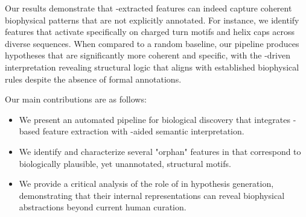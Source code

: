 Our results demonstrate that \sae-extracted features can indeed capture coherent biophysical patterns that are not explicitly annotated. For instance, we identify features that activate specifically on charged turn motifs and helix caps across diverse sequences. When compared to a random baseline, our pipeline produces hypotheses that are significantly more coherent and specific, with the \gpt-driven interpretation revealing structural logic that aligns with established biophysical rules despite the absence of formal annotations.

Our main contributions are as follows:
\begin{itemize}[leftmargin=*,itemsep=0pt,topsep=0pt]
    \item We present an automated pipeline for biological discovery that integrates \sae-based feature extraction with \gpt-aided semantic interpretation.
    \item We identify and characterize several "orphan" features in \esm that correspond to biologically plausible, yet unannotated, structural motifs.
    \item We provide a critical analysis of the role of \plms in hypothesis generation, demonstrating that their internal representations can reveal biophysical abstractions beyond current human curation.
\end{itemize}
